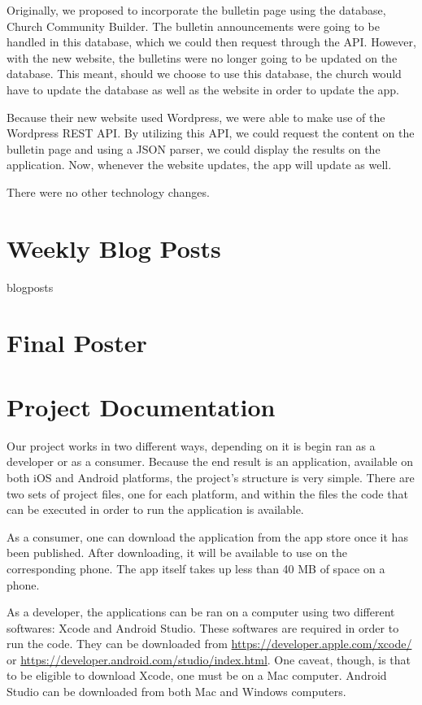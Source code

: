 \documentclass[letterpaper,10pt,draftclsnofoot,onecolumn,titlepage]{IEEEtran}
\begin{document}
	Originally, we proposed to incorporate the bulletin page using the database, Church Community Builder. 
	The bulletin announcements were going to be handled in this database, which we could then request through the API. 
	However, with the new website, the bulletins were no longer going to be updated on the database. 
	This meant, should we choose to use this database, the church would have to update the database as well as the website in order to update the app. 
	
	Because their new website used Wordpress, we were able to make use of the Wordpress REST API. 
	By utilizing this API, we could request the content on the bulletin page and using a JSON parser, we could display the results on the application. 
	Now, whenever the website updates, the app will update as well. 
	
	There were no other technology changes. 
	
\section{Weekly Blog Posts}

	{blogposts}
	
\section{Final Poster}



\section{Project Documentation}

Our project works in two different ways, depending on it is begin ran as a developer or as a consumer. 
Because the end result is an application, available on both iOS and Android platforms, the project's structure is very simple. 
There are two sets of project files, one for each platform, and within the files the code that can be executed in order to run the application is available. 

As a consumer, one can download the application from the app store once it has been published. 
After downloading, it will be available to use on the corresponding phone. 
The app itself takes up less than 40 MB of space on a phone. 

As a developer, the applications can be ran on a computer using two different softwares: Xcode and Android Studio. 
These softwares are required in order to run the code.
They can be downloaded from \url{https://developer.apple.com/xcode/} or \url{https://developer.android.com/studio/index.html}. 
One caveat, though, is that to be eligible to download Xcode, one must be on a Mac computer. 
Android Studio can be downloaded from both Mac and Windows computers. 
\end{document}
